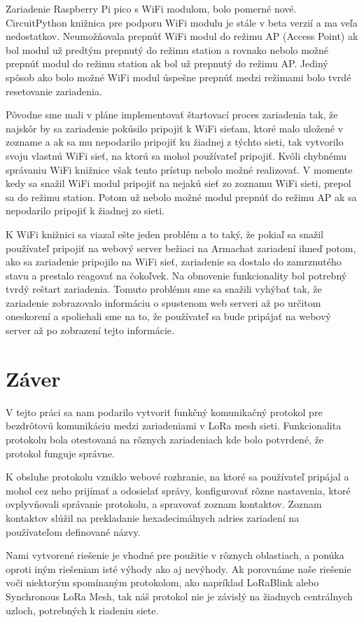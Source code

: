 \documentclass[slovak,master]{diploma}
\begin{document}
Zariadenie Raspberry Pi pico s WiFi modulom, bolo pomerné nové. CircuitPython knižnica pre podporu WiFi modulu je stále v beta verzií a ma veľa nedostatkov.
Neumožňovala prepnúť WiFi modul do režimu AP (Access Point) ak bol modul už predtým prepnutý do režimu station a rovnako nebolo možné prepnúť modul do režimu station ak bol 
už prepnutý do režimu AP. Jediný spôsob ako bolo možné WiFi modul úspešne prepnúť medzi režimami bolo tvrdé resetovanie zariadenia. 

Pôvodne sme mali v pláne implementovať štartovací proces zariadenia tak, že najskôr by sa zariadenie pokúsilo pripojiť k WiFi sieťam, ktoré malo uložené v zozname a ak sa mu nepodarilo 
pripojiť ku žiadnej z týchto sieti, tak vytvorilo svoju vlastnú WiFi sieť, na ktorú sa mohol používateľ pripojiť. Kvôli chybnému správaniu WiFi knižnice však tento prístup nebolo možné 
realizovať. V momente kedy sa snažil WiFi modul pripojiť na nejakú sieť zo zoznamu WiFi sieti, prepol sa do režimu station. Potom už nebolo možné modul prepnúť do režimu AP ak sa nepodarilo pripojiť 
k žiadnej zo sieti.

K WiFi knižnici sa viazal ešte jeden problém a to taký, že pokiaľ sa snažil používateľ pripojiť na webový server bežiaci na Armachat zariadení ihneď potom, ako sa zariadenie pripojilo na WiFi sieť, 
zariadenie sa dostalo do zamrznutého stavu a prestalo reagovať na čokoľvek. Na obnovenie funkcionality bol potrebný tvrdý reštart zariadenia. 
Tomuto problému sme sa snažili vyhýbať tak, že zariadenie zobrazovalo informáciu o spustenom web serveri až po určitom oneskorení a spoliehali sme na to, že používateľ 
sa bude pripájať na webový server až po zobrazení tejto informácie.

\chapter{Záver}
V tejto práci sa nam podarilo vytvoriť funkčný komunikačný protokol pre bezdrôtovú komunikáciu medzi zariadeniami v LoRa mesh sieti.
Funkcionalita protokolu bola otestovaná na rôznych zariadeniach kde bolo potvrdené, že protokol funguje správne. 

K obsluhe protokolu vzniklo webové rozhranie, na ktoré sa používateľ pripájal a mohol cez neho prijímať a odosielať správy, konfigurovať 
rôzne nastavenia, ktoré ovplyvňovali správanie protokolu, a spravovať zoznam kontaktov. Zoznam kontaktov slúžil na prekladanie 
hexadecimálnych adries zariadení na používateľom definované názvy.

Nami vytvorené riešenie je vhodné pre použitie v rôznych oblastiach, a ponúka oproti iným riešeniam isté výhody ako aj nevýhody.
Ak porovnáme naše riešenie voči niektorým spomínaným protokolom, ako napríklad LoRaBlink alebo Synchronous LoRa Mesh, 
tak náš protokol nie je závislý na žiadnych centrálnych uzloch, potrebných k riadeniu siete.
\end{document}
